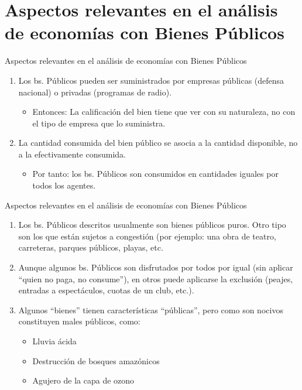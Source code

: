 \section[Relevancia]{Aspectos relevantes en el análisis de economías con Bienes Públicos}

\begin{frame}{Aspectos relevantes en el análisis de economías con Bienes Públicos}
	\begin{enumerate}
		\item Los bs. Públicos pueden ser suministrados por empresas públicas (defensa nacional) o privadas (programas de radio). 
			\begin{itemize}
				\item Entonces: La calificación del bien tiene que ver con su naturaleza, no con el tipo de empresa que lo suministra.
			\end{itemize}
		\item La cantidad consumida del bien público se asocia a la cantidad disponible, no a la efectivamente consumida.
			\begin{itemize}
				\item Por tanto: los bs. Públicos son consumidos en cantidades iguales por todos los agentes.
			\end{itemize}
	\end{enumerate}
\end{frame}
\begin{frame}{Aspectos relevantes en el análisis de economías con Bienes Públicos}
	\begin{enumerate}[3]
		\item Los bs. Públicos descritos usualmente son bienes públicos puros. Otro tipo son los que están sujetos a congestión (por ejemplo: una obra de teatro, carreteras, parques públicos, playas, etc.
		\item Aunque algunos bs. Públicos son disfrutados por todos por igual (sin aplicar “quien no paga, no consume”), en otros puede aplicarse la exclusión (peajes, entradas a espectáculos, cuotas de un club, etc.).
		\item Algunos ``bienes'' tienen características ``públicas'', pero como son nocivos constituyen males públicos, como:
			\begin{itemize}
				\item Lluvia ácida
				\item Destrucción de bosques amazónicos
				\item Agujero de la capa de ozono
			\end{itemize}
	\end{enumerate}
\end{frame}
